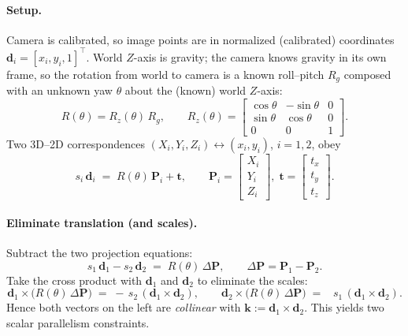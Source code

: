 \documentclass[12pt]{article}
\begin{document}
\paragraph{Setup.}
Camera is calibrated, so image points are in normalized (calibrated) coordinates
\(\mathbf{d}_i=[x_i,y_i,1]^\top\).
World \(Z\)-axis is gravity; the camera knows gravity in its own frame, so the
rotation from world to camera is a known roll–pitch \(R_g\) composed with an
unknown yaw \(\theta\) about the (known) world \(Z\)-axis:
\[
R(\theta)=R_z(\theta)\,R_g,\qquad
R_z(\theta)=
\begin{bmatrix}
\cos\theta&-\sin\theta&0\\
\sin\theta& \cos\theta&0\\
0&0&1
\end{bmatrix}.
\]
Two 3D–2D correspondences \((X_i,Y_i,Z_i)\leftrightarrow (x_i,y_i)\), \(i=1,2\), obey
\[
s_i\,\mathbf{d}_i \;=\; R(\theta)\,\mathbf{P}_i + \mathbf{t},
\qquad \mathbf{P}_i=\begin{bmatrix}X_i\\Y_i\\Z_i\end{bmatrix},\;
\mathbf{t}=\begin{bmatrix}t_x\\t_y\\t_z\end{bmatrix}.
\]

\paragraph{Eliminate translation (and scales).}
Subtract the two projection equations:
\[
s_1\,\mathbf{d}_1 - s_2\,\mathbf{d}_2 \;=\; R(\theta)\,\Delta\mathbf{P},
\qquad \Delta\mathbf{P}=\mathbf{P}_1-\mathbf{P}_2.
\]
Take the cross product with \(\mathbf{d}_1\) and \(\mathbf{d}_2\) to eliminate the scales:
\[
\mathbf{d}_1 \times \big(R(\theta)\,\Delta\mathbf{P}\big) \;=\; -\,s_2\,(\mathbf{d}_1\times\mathbf{d}_2),\qquad
\mathbf{d}_2 \times \big(R(\theta)\,\Delta\mathbf{P}\big) \;=\;\;\; s_1\,(\mathbf{d}_1\times\mathbf{d}_2).
\]
Hence both vectors on the left are \emph{collinear} with \(\mathbf{k}:=\mathbf{d}_1\times\mathbf{d}_2\).
This yields two scalar parallelism constraints.
\end{document}
